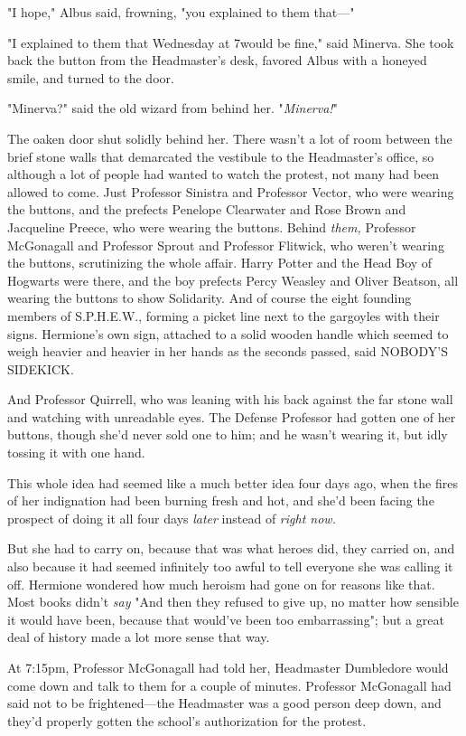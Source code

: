 "I hope," Albus said, frowning, "you explained to them that---"

"I explained to them that Wednesday at 7\PM would be fine," said Minerva. She 
took back the button from the Headmaster's desk, favored Albus with a honeyed 
smile, and turned to the door.

"Minerva?" said the old wizard from behind her. "\emph{Minerva!}"

The oaken door shut solidly behind her.
\sbreak
There wasn't a lot of room between the brief stone walls that demarcated the 
vestibule to the Headmaster's office, so although a lot of people had wanted to 
watch the protest, not many had been allowed to come. Just Professor Sinistra 
and Professor Vector, who were wearing the buttons, and the prefects Penelope 
Clearwater and Rose Brown and Jacqueline Preece, who were wearing the buttons. 
Behind \emph{them,} Professor McGonagall and Professor Sprout and Professor 
Flitwick, who weren't wearing the buttons, scrutinizing the whole affair. Harry 
Potter and the Head Boy of Hogwarts were there, and the boy prefects Percy 
Weasley and Oliver Beatson, all wearing the buttons to show Solidarity. And of 
course the eight founding members of S.P.H.E.W., forming a picket line next to 
the gargoyles with their signs. Hermione's own sign, attached to a solid wooden 
handle which seemed to weigh heavier and heavier in her hands as the seconds 
passed, said NOBODY'S SIDEKICK.

And Professor Quirrell, who was leaning with his back against the far stone 
wall and watching with unreadable eyes. The Defense Professor had gotten one of 
her buttons, though she'd never sold one to him; and he wasn't wearing it, but 
idly tossing it with one hand.

This whole idea had seemed like a much better idea four days ago, when the 
fires of her indignation had been burning fresh and hot, and she'd been facing 
the prospect of doing it all four days \emph{later} instead of \emph{right now.}

But she had to carry on, because that was what heroes did, they carried on, and 
also because it had seemed infinitely too awful to tell everyone she was 
calling it off. Hermione wondered how much heroism had gone on for reasons like 
that. Most books didn't \emph{say} "And then they refused to give up, no matter 
how sensible it would have been, because that would've been too embarrassing"; 
but a great deal of history made a lot more sense that way.

At 7:15pm, Professor McGonagall had told her, Headmaster Dumbledore would come 
down and talk to them for a couple of minutes. Professor McGonagall had said 
not to be frightened---the Headmaster was a good person deep down, and they'd 
properly gotten the school's authorization for the protest.

